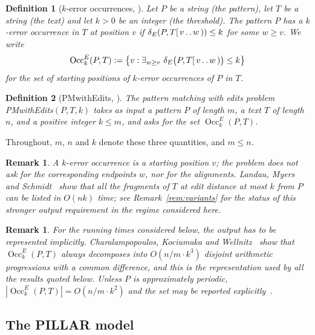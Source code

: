 \documentclass[10pt]{article}
\newtheorem{definition}{Definition}
\newtheorem{remark}[theorem]{Remark}
\newcommand{\dE}{\delta_E}
\newcommand{\Occ}{\operatorname{Occ}^E}
\newcommand{\PILLAR}{\textnormal{PILLAR}}
\newcommand{\PMwE}{\textnormal{PMwith\hspace{0pt}Edits}}
\begin{document}
\begin{definition}[$k$-error occurrences, {\cite[Section 1.3]{CKW22}}]\label{def:occ}
Let $P$ be a string (the \emph{pattern}), let $T$ be a string (the \emph{text})
and let $k>0$ be an integer (the \emph{threshold}). The pattern $P$ has a
\emph{$k$-error occurrence} in $T$ at position $v$ if $\dE(P,T[\,v\mathinner{.\,.}w\,))\le k$
for some $w\ge v$. We write
\[
\Occ_k(P,T):=\bigl\{v:\exists_{w\ge v}\ \dE\bigl(P,T[\,v\mathinner{.\,.}w\,)\bigr)\le k\bigr\}
\]
for the set of starting positions of $k$-error occurrences of $P$ in $T$.
\end{definition}

\begin{definition}[\PMwE{}, {\cite[Section 1.3]{CKW22}}]\label{def:pmwe}
The \emph{pattern matching with edits} problem \PMwE$(P,T,k)$ takes as input a
pattern $P$ of length $m$, a text $T$ of length $n$, and a positive integer
$k\le m$, and asks for the set $\Occ_k(P,T)$.
\end{definition}

Throughout, $m$, $n$ and $k$ denote these three quantities, and $m\le n$.

\begin{remark}\label{rem:report}
A $k$-error occurrence is a \emph{starting position} $v$; the problem does not
ask for the corresponding endpoints $w$, nor for the alignments. Landau, Myers
and Schmidt~\cite{LMS98} show that all the fragments of $T$ at edit distance
at most $k$ from $P$ can be listed in $O(nk)$ time; see
Remark~\ref{rem:variants} for the status of this stronger output requirement in
the regime considered here.
\end{remark}

\begin{remark}\label{rem:output}
For the running times considered below, the output has to be represented
implicitly. Charalampopoulos, Kociumaka and Wellnitz~\cite[Main Theorem
7]{CKW20} show that $\Occ_k(P,T)$ always decomposes into $O(n/m\cdot k^3)$
disjoint arithmetic progressions with a common difference, and this is the
representation used by all the results quoted below. Unless $P$ is
approximately periodic, $|\Occ_k(P,T)|=O(n/m\cdot k^2)$ and the set may be
reported explicitly~\cite[Section 1]{CKW22}.
\end{remark}

\subsection{The \PILLAR{} model}\label{sec:pillar}
\end{document}
